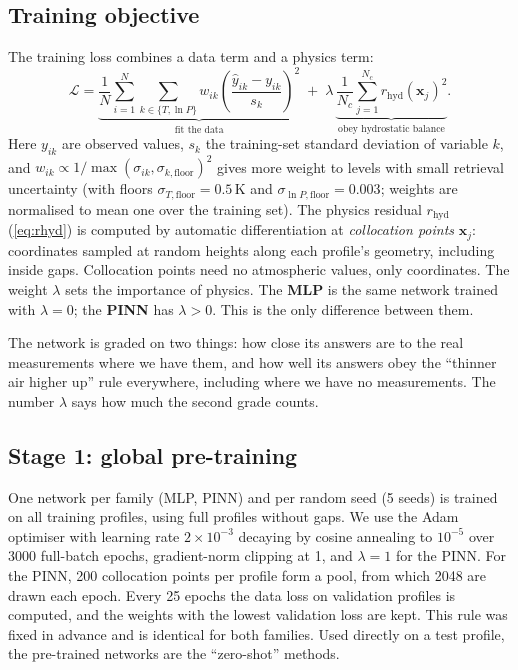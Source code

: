 \documentclass[11pt,a4paper]{article}
\newcommand{\rhyd}{r_{\mathrm{hyd}}}
\begin{document}
\subsection{Training objective}\label{sec:loss}
The training loss combines a data term and a physics term:
\begin{equation}
\mathcal{L} = \underbrace{\frac{1}{N}\sum_{i=1}^{N}\sum_{k\in\{T,\ln P\}} w_{ik}\left(\frac{\hat y_{ik}-y_{ik}}{s_k}\right)^2}_{\text{fit the data}}
\;+\;\lambda\,\underbrace{\frac{1}{N_c}\sum_{j=1}^{N_c}\rhyd(\mathbf{x}_j)^2}_{\text{obey hydrostatic balance}}. \label{eq:loss}
\end{equation}
Here $y_{ik}$ are observed values, $s_k$ the training-set standard deviation of variable $k$, and $w_{ik}\propto 1/\max(\sigma_{ik},\sigma_{k,\mathrm{floor}})^2$ gives more weight to levels with small retrieval uncertainty (with floors $\sigma_{T,\mathrm{floor}}=0.5$\,K and $\sigma_{\ln P,\mathrm{floor}}=0.003$; weights are normalised to mean one over the training set). The physics residual $\rhyd$ (\cref{eq:rhyd}) is computed by automatic differentiation at \emph{collocation points} $\mathbf{x}_j$: coordinates sampled at random heights along each profile's geometry, including inside gaps. Collocation points need no atmospheric values, only coordinates. The weight $\lambda$ sets the importance of physics. The \textbf{MLP} is the same network trained with $\lambda=0$; the \textbf{PINN} has $\lambda>0$. This is the only difference between them.

\begin{plainbox}
The network is graded on two things: how close its answers are to the real measurements where we have them, and how well its answers obey the ``thinner air higher up'' rule everywhere, including where we have no measurements. The number $\lambda$ says how much the second grade counts.
\end{plainbox}

\subsection{Stage 1: global pre-training}
One network per family (MLP, PINN) and per random seed (5 seeds) is trained on all training profiles, using full profiles without gaps. We use the Adam optimiser \citep{kingma2015} with learning rate $2\times10^{-3}$ decaying by cosine annealing to $10^{-5}$ over 3000 full-batch epochs, gradient-norm clipping at 1, and $\lambda=1$ for the PINN. For the PINN, 200 collocation points per profile form a pool, from which 2048 are drawn each epoch. Every 25 epochs the data loss on validation profiles is computed, and the weights with the lowest validation loss are kept. This rule was fixed in advance and is identical for both families. Used directly on a test profile, the pre-trained networks are the ``zero-shot'' methods.
\end{document}
